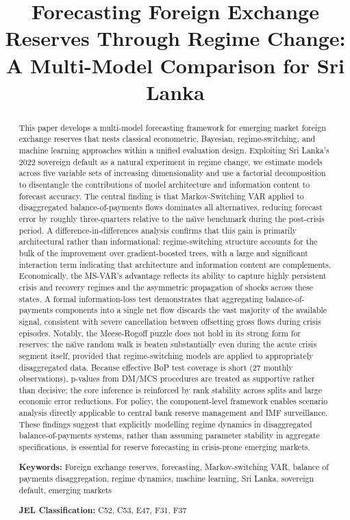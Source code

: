 \documentclass[12pt,a4paper]{article}
\title{Forecasting Foreign Exchange Reserves Through Regime Change: \\
A Multi-Model Comparison for Sri Lanka}
\author{}
\date{}
\begin{document}
\maketitle

\begin{abstract}
This paper develops a multi-model forecasting framework for emerging market foreign exchange reserves that nests classical econometric, Bayesian, regime-switching, and machine learning approaches within a unified evaluation design. Exploiting Sri Lanka's 2022 sovereign default as a natural experiment in regime change, we estimate models across five variable sets of increasing dimensionality and use a factorial decomposition to disentangle the contributions of model architecture and information content to forecast accuracy. The central finding is that Markov-Switching VAR applied to disaggregated balance-of-payments flows dominates all alternatives, reducing forecast error by roughly three-quarters relative to the na\"{\i}ve benchmark during the post-crisis period. A difference-in-differences analysis confirms that this gain is primarily architectural rather than informational: regime-switching structure accounts for the bulk of the improvement over gradient-boosted trees, with a large and significant interaction term indicating that architecture and information content are complements. Economically, the MS-VAR's advantage reflects its ability to capture highly persistent crisis and recovery regimes and the asymmetric propagation of shocks across these states. A formal information-loss test demonstrates that aggregating balance-of-payments components into a single net flow discards the vast majority of the available signal, consistent with severe cancellation between offsetting gross flows during crisis episodes. Notably, the Meese-Rogoff puzzle does not hold in its strong form for reserves: the na\"{\i}ve random walk is beaten substantially even during the acute crisis segment itself, provided that regime-switching models are applied to appropriately disaggregated data. Because effective BoP test coverage is short (27 monthly observations), p-values from DM/MCS procedures are treated as supportive rather than decisive; the core inference is reinforced by rank stability across splits and large economic error reductions. For policy, the component-level framework enables scenario analysis directly applicable to central bank reserve management and IMF surveillance. These findings suggest that explicitly modelling regime dynamics in disaggregated balance-of-payments systems, rather than assuming parameter stability in aggregate specifications, is essential for reserve forecasting in crisis-prone emerging markets.

\noindent\textbf{Keywords:} Foreign exchange reserves, forecasting, Markov-switching VAR, balance of payments disaggregation, regime dynamics, machine learning, Sri Lanka, sovereign default, emerging markets

\noindent\textbf{JEL Classification:} C52, C53, E47, F31, F37
\end{abstract}
\end{document}
